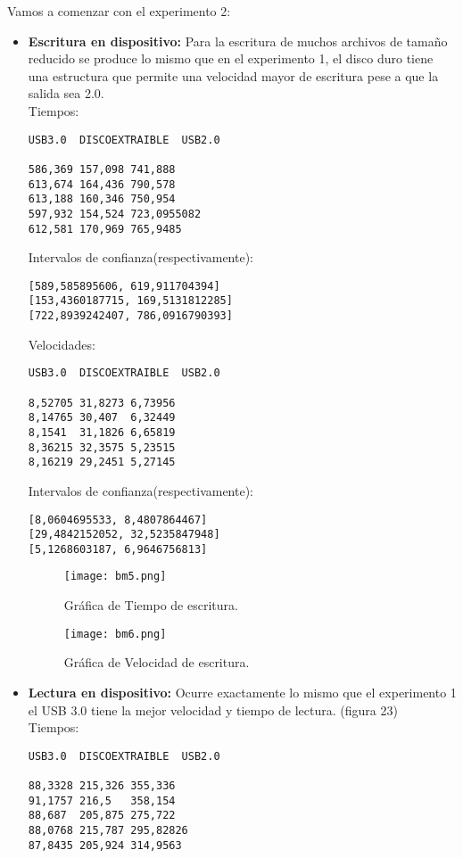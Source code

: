 \documentclass[a4paper, 10pt]{article} %
\begin{document}
Vamos a comenzar con el experimento 2:
\begin{itemize}
\item \textbf{Escritura en dispositivo:}
Para la escritura de muchos archivos de tamaño reducido se produce lo mismo que en el experimento 1, el disco duro tiene una estructura que permite una velocidad mayor de escritura pese a que la salida sea 2.0.\\
Tiempos:
\begin{verbatim}
USB3.0	DISCOEXTRAIBLE	USB2.0
	
586,369	157,098	741,888
613,674	164,436	790,578
613,188	160,346	750,954
597,932	154,524	723,0955082
612,581	170,969	765,9485
\end{verbatim}
Intervalos de confianza(respectivamente): 
\begin{verbatim}
[589,585895606, 619,911704394]
[153,4360187715, 169,5131812285]
[722,8939242407, 786,0916790393]

\end{verbatim}
Velocidades:
\begin{verbatim}
USB3.0	DISCOEXTRAIBLE	USB2.0
	
8,52705	31,8273	6,73956
8,14765	30,407	6,32449
8,1541	31,1826	6,65819
8,36215	32,3575	5,23515
8,16219	29,2451	5,27145
\end{verbatim}
Intervalos de confianza(respectivamente): 
\begin{verbatim}
[8,0604695533, 8,4807864467]
[29,4842152052, 32,5235847948]
[5,1268603187, 6,9646756813]

\end{verbatim}
\begin{figure}[H]
\centering 
\texttt{[image: bm5.png]} 
\caption{Gráfica de Tiempo de escritura.} 
\label{contexto:figura} 
\end{figure}
\begin{figure}[H]
\centering 
\texttt{[image: bm6.png]} 
\caption{Gráfica de Velocidad de escritura.} 
\label{contexto:figura} 
\end{figure}
\item \textbf{Lectura en dispositivo:} Ocurre exactamente lo mismo que el experimento 1 el USB 3.0 tiene la mejor velocidad y tiempo de lectura. (figura 23)\\
Tiempos:
\begin{verbatim}
USB3.0	DISCOEXTRAIBLE	USB2.0
	
88,3328	215,326	355,336
91,1757	216,5	358,154
88,687	205,875	275,722
88,0768	215,787	295,82826
87,8435	205,924	314,9563




\end{verbatim}
\end{itemize}
\end{document}
